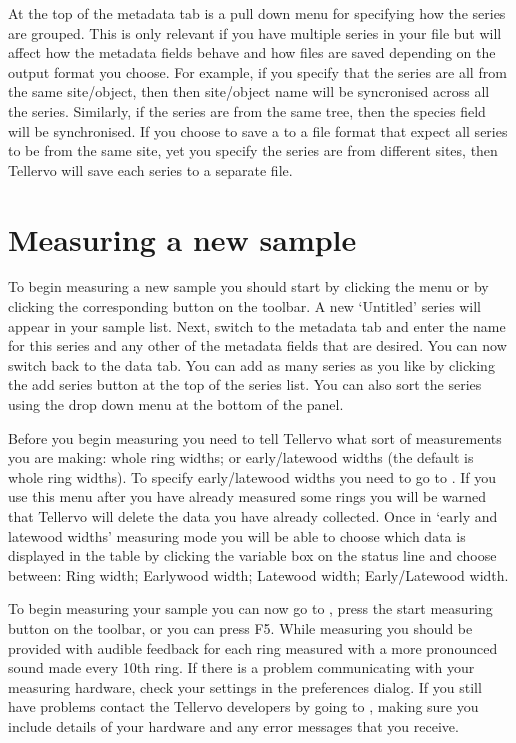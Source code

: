 At the top of the metadata tab is a pull down menu for specifying how the series are grouped.  This is only relevant if you have multiple series in your file but will affect how the metadata fields behave and how files are saved depending on the output format you choose.  For example, if you specify that the series are all from the same site/object, then then site/object name will be syncronised across all the series.  Similarly, if the series are from the same tree, then the species field will be synchronised.  If you choose to save a to a file format that expect all series to be from the same site, yet you specify the series are from different sites, then Tellervo will save each series to a separate file.


\section{Measuring a new sample}

To begin measuring a new sample you should start by clicking the  menu or by clicking the corresponding button on the toolbar.  A new `Untitled' series will appear in your sample list.  Next, switch to the metadata tab and enter the name for this series and any other of the metadata fields that are desired.  You can now switch back to the data tab.  You can add as many series as you like by clicking the add series button at the top of the series list.  You can also sort the series using the drop down menu at the bottom of the panel.

Before you begin measuring you need to tell Tellervo what sort of measurements you are making: whole ring widths; or early/latewood widths (the default is whole ring widths).  To specify early/latewood widths you need to go to .  If you use this menu after you have already measured some rings you will be warned that Tellervo will delete the data you have already collected.  Once in `early and latewood widths' measuring mode you will be able to choose which data is displayed in the table by clicking the variable box on the status line and choose between: Ring width; Earlywood width; Latewood width; Early/Latewood width.

To begin measuring your sample you can now go to , press the start measuring button on the toolbar, or you can press F5. While measuring you should be provided with audible feedback for each ring measured with a more pronounced sound made every 10th ring. If there is a problem communicating with your measuring hardware, check your settings in the preferences dialog. If you still have problems contact the Tellervo developers by going to , making sure you include details of your hardware and any error messages that you receive.

